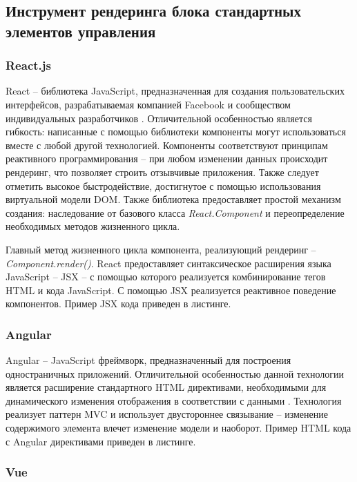 \subsection{Инструмент рендеринга блока стандартных элементов управления}

\subsubsection{React.js}

React -- библиотека JavaScript, предназначенная для создания пользовательских интерфейсов, разрабатываемая компанией Facebook и сообществом индивидуальных разработчиков \cite{reactjs}. Отличительной особенностью является гибкость: написанные с помощью библиотеки компоненты могут использоваться вместе с любой другой технологией. Компоненты соответствуют принципам реактивного программирования -- при любом изменении данных происходит рендеринг, что позволяет строить отзывчивые приложения. Также следует отметить высокое быстродействие, достигнутое с помощью использования виртуальной модели DOM. Также библиотека предоставляет простой механизм создания: наследование от базового класса \textit{React.Component} и переопределение необходимых методов жизненного цикла.
 
Главный метод жизненного цикла компонента, реализующий рендеринг -- \textit{Component.render()}. React предоставляет синтаксическое расширения языка JavaScript -- JSX -- с помощью которого реализуется комбинирование тегов HTML и кода JavaScript. С помощью JSX реализуется реактивное поведение компонентов. Пример JSX кода приведен в листинге.

\subsubsection{Angular}

Angular – JavaScript фреймворк, предназначенный для построения одностраничных приложений. Отличительной особенностью данной технологии является расширение стандартного HTML директивами, необходимыми для динамического изменения отображения в соответствии с данными \cite{angular}. Технология реализует паттерн MVC и использует двустороннее связывание – изменение содержимого элемента влечет изменение модели и наоборот. Пример HTML кода с Angular директивами приведен в листинге. 

\subsubsection{Vue}

